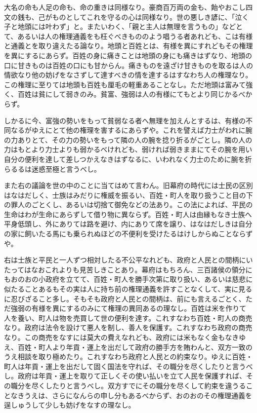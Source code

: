 \documentclass[a4paper, platex, dvipdfmx]{jsarticle}
\begin{document}
大名の命も人足の命も、命の重きは同様なり。豪商百万両の金も、飴やおこし四文の銭も、己がものとしてこれを守るの心は同様なり。世の悪しき諺に、「泣く子と地頭には叶わず」と。またいわく、「親と主人は無理を言うもの」などとて、あるいは人の権理通義をも枉ぐべきもののよう唱うる者あれども、こは有様と通義とを取り違えたる論なり。地頭と百姓とは、有様を異にすれどもその権理を異にするにあらず。百姓の身に痛きことは地頭の身にも痛きはずなり、地頭の口に甘きものは百姓の口にも甘からん。痛きものを遠ざけ甘きものを取るは人の情欲なり他の妨げをなさずして達すべきの情を達するはすなわち人の権理なり。この権理に至りては地頭も百姓も厘毛の軽重あることなし。ただ地頭は富みて強く、百姓は貧にして弱きのみ。貧富、強弱は人の有様にてもとより同じかるべからず。

しかるに今、富強の勢いをもって貧弱なる者へ無理を加えんとするは、有様の不同なるがゆえにとて他の権理を害するにあらずや。これを譬えば力士がわれに腕の力ありとて、その力の勢いをもって隣の人の腕を捻り折るがごとし。隣の人の力はもとより力士よりも弱かるべけれども、弱ければ弱きままにてその腕を用い自分の便利を達して差しつかえなきはずなるに、いわれなく力士のために腕を折らるるは迷惑至極と言うべし。

また右の議論を世の中のことに当てはめて言わん。旧幕府の時代には士民の区別はなはだしく、士族はみだりに権威を振るい、百姓・町人を取り扱うこと目の下の罪人のごとくし、あるいは切捨て御免などの法あり。この法によれば、平民の生命はわが生命にあらずして借り物に異ならず。百姓・町人は由縁もなき士族へ平身低頭し、外にありては路を避け、内にありて席を譲り、はなはだしきは自分の家に飼いたる馬にも乗られぬほどの不便利を受けたるはけしからぬことならずや。

右は士族と平民と一人ずつ相対したる不公平なれども、政府と人民との間柄にいたってはなおこれよりも見苦しきことあり。幕府はもちろん、三百諸侯の領分にもおのおの小政府を立てて、百姓・町人を勝手次第に取り扱い、あるいは慈悲に似たることあるもその実は人に持ち前の権理通義を許すことなくして、実に見るに忍びざること多し。そもそも政府と人民との間柄は、前にも言えるごとく、ただ強弱の有様を異にするのみにて権理の異同あるの理なし。百姓は米を作りて人を養い、町人は物を売買して世の便利を達す。これすなわち百姓・町人の商売なり。政府は法令を設けて悪人を制し、善人を保護す。これすなわち政府の商売なり。この商売をなすには莫大の費えなれども、政府には米もなく金もなきゆえ、百姓・町人より年貢・運上を出だして政府の勝手方を賄わんと、双方一致のうえ相談を取り極めたり。これすなわち政府と人民との約束なり。ゆえに百姓・町人は年貢・運上を出だして固く国法を守れば、その職分を尽くしたりと言うべし。政府は年貢・運上を取りて正しくその使い払いを立て人民を保護すれば、その職分を尽くしたりと言うべし。双方すでにその職分を尽くして約束を違うることなきうえは、さらになんらの申し分もあるべからず、おのおのその権理通義を逞しゅうして少しも妨げをなすの理なし。
\end{document}
